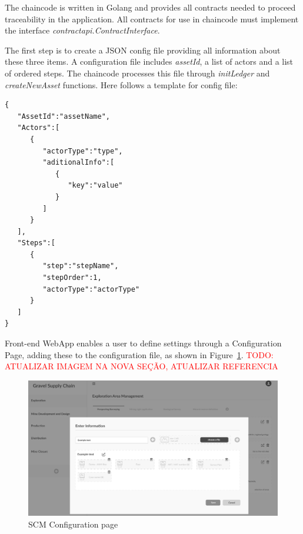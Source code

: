 The chaincode is written in Golang and provides all contracts needed to proceed traceability in the application. All contracts for use in chaincode must implement the interface \textit{contractapi.ContractInterface}. 

The first step is to create a JSON config file providing all information about these three items. A configuration file includes \textit{assetId}, a list of actors and a list of ordered steps. The chaincode processes this file through  \textit{initLedger} and \textit{createNewAsset} functions. Here follows a template for config file:  


\begin{verbatim}
{
   "AssetId":"assetName",
   "Actors":[
      {
         "actorType":"type",
         "aditionalInfo":[
            {
               "key":"value"
            }
         ]
      }
   ],
   "Steps":[
      {
         "step":"stepName",
         "stepOrder":1,
         "actorType":"actorType"
      }
   ]
}
\end{verbatim}

Front-end WebApp enables a user to define settings through a Configuration Page, adding these to the configuration file, as shown in Figure~\ref{fig:frontend02}.
\textcolor{red}{TODO: ATUALIZAR IMAGEM NA NOVA SEÇÃO, ATUALIZAR REFERENCIA}

\begin{figure}[ht]
\begin{center}
  \includegraphics[scale=0.265]{images/frontend02.png}
\caption{SCM Configuration page}
\label{fig:frontend02}
\end{center}
\end{figure}

